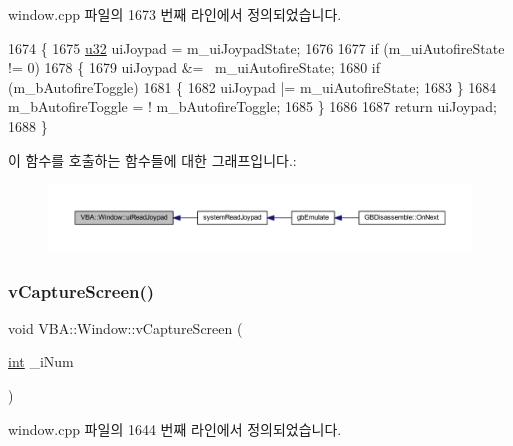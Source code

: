 window.\+cpp 파일의 1673 번째 라인에서 정의되었습니다.


\begin{DoxyCode}
1674 \{
1675   \mbox{\hyperlink{_system_8h_a10e94b422ef0c20dcdec20d31a1f5049}{u32}} uiJoypad = m\_uiJoypadState;
1676 
1677   \textcolor{keywordflow}{if} (m\_uiAutofireState != 0)
1678   \{
1679     uiJoypad &= ~m\_uiAutofireState;
1680     \textcolor{keywordflow}{if} (m\_bAutofireToggle)
1681     \{
1682       uiJoypad |= m\_uiAutofireState;
1683     \}
1684     m\_bAutofireToggle = ! m\_bAutofireToggle;
1685   \}
1686 
1687   \textcolor{keywordflow}{return} uiJoypad;
1688 \}
\end{DoxyCode}
이 함수를 호출하는 함수들에 대한 그래프입니다.\+:
\nopagebreak
\begin{figure}[H]
\begin{center}
\leavevmode
\includegraphics[width=350pt]{class_v_b_a_1_1_window_ad5768e6fccecbcc761de003ae915684b_icgraph}
\end{center}
\end{figure}
\mbox{\label{class_v_b_a_1_1_window_a68341ae65a5ec41c6e6269d6f579aa08}} 
\subsubsection{\texorpdfstring{v\+Capture\+Screen()}{vCaptureScreen()}}
{\footnotesize\ttfamily void V\+B\+A\+::\+Window\+::v\+Capture\+Screen (\begin{DoxyParamCaption}\item[{\mbox{\hyperlink{_util_8cpp_a0ef32aa8672df19503a49fab2d0c8071}{int}}}]{\+\_\+i\+Num }\end{DoxyParamCaption})}



window.\+cpp 파일의 1644 번째 라인에서 정의되었습니다.


